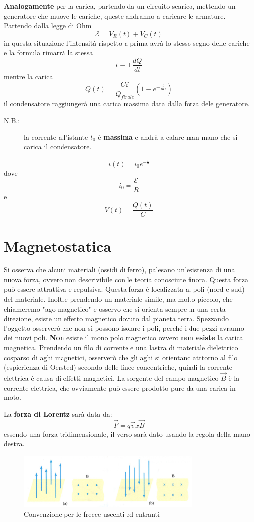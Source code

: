 \documentclass[a4paper, 12pt]{book}
\theoremstyle{plain}
\begin{document}
\textbf{Analogamente} per la carica, partendo da un circuito 
scarico, mettendo un generatore che muove le cariche, queste 
andranno a caricare le armature. Partendo dalla legge di 
Ohm \[ \mathcal{E} = V_R(t) + V_C(t) \] in questa situazione 
l'intensità rispetto a prima avrà lo stesso segno delle cariche e 
la formula rimarrà la stessa \[ i = +\frac{dQ}{dt} \] 
mentre la carica \[ Q(t) = \frac{C \mathcal{E} }{Q_{finale}} (1 - e^{-\frac{t}{RC}}) \] il condensatore 
raggiungerà una carica massima data dalla forza dele generatore.
\begin{description}
    \item[N.B.:] la corrente all'istante $t_0$ è \textbf{massima} e andrà a calare man mano che si carica il condensatore.
\end{description}
\[i(t) = i_0 e^{-\frac{t}{\tau}} \] dove \[ i_0 = \frac{\mathcal{E}}{R} \] 
e \[ V(t) = \frac{Q(t)}{C} \] 

\chapter{Magnetostatica}

Si osserva che alcuni materiali (ossidi di ferro), palesano 
un'esistenza di una nuova forza, ovvero non descrivibile con le 
teoria conosciute finora. Questa forza può essere attrattiva e repulsiva.
Questa forza è localizzata ai poli (nord e sud) del materiale.
Inoltre prendendo un materiale simile, ma molto piccolo,
che chiameremo "ago magnetico" e osservo che si orienta
sempre in una certa direzione, esiste un effetto magnetico
dovuto dal pianeta terra. Spezzando l'oggetto osserverò 
che non si possono isolare i poli, perché i due pezzi 
avranno dei nuovi poli. \textbf{Non} esiste il mono polo magnetico
ovvero \textbf{non esiste} la carica magnetica. Prendendo 
un filo di corrente e una lastra di materiale dielettrico cosparso di 
aghi magnetici, osserverò che gli aghi si orientano atttorno 
al filo (espierienza di Oersted) secondo delle linee concentriche, 
quindi la corrente elettrica è causa di effetti magnetici.
La sorgente del campo magnetico $\vec{B}$ è la corrente 
elettrica, che ovviamente può essere prodotto pure da una 
carica in moto.

La \textbf{forza di Lorentz} sarà data da: \[ \vec{F} = q \vec{v} x \vec{B} \] 
essendo una forza tridimensionale, il verso sarà dato 
usando la regola della mano destra.
\begin{figure}
    \includegraphics[width=0.8\textwidth]{frecce.png}
    \caption{Convenzione per le frecce uscenti ed entranti}
\end{figure}
\end{document}
